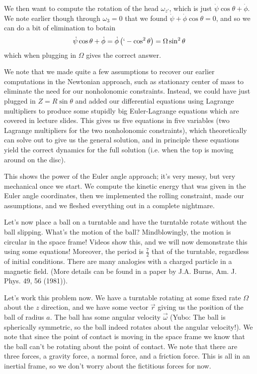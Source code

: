 \documentclass[10pt]{report}
\begin{document}
We then want to compute the rotation of the head $\omega_{z'}$, which is just $\dot{\psi}\cos\theta + \dot{\phi}$. We note earlier though through $\omega_3 = 0$ that we found $\dot{\psi} + \dot{\phi}\cos\theta = 0$, and so we can do a bit of elimination to botain
$$\dot{\psi}\cos\theta + \dot{\phi} = \dot{\phi}\left( `-\cos^2\theta \right) = \Omega\sin^2\theta$$
which when plugging in $\Omega$ gives the correct answer.

We note that we made quite a few assumptions to recover our earlier computations in the Newtonian approach, such as stationary center of mass to eliminate the need for our nonholonomic constraints. Instead, we could have just plugged in $Z = R\sin\theta$ and added our differential equations using Lagrange multipliers to produce some stupidly big Euler-Lagrange equations which are covered in lecture slides. This gives us five equations in five variables (two Lagrange multipliers for the two nonholonomic constraints), which theoretically can solve out to give us the general solution, and in principle these equations yield the correct dynamics for the full solution (i.e. when the top is moving around on the disc). 

This shows the power of the Euler angle approach; it's very messy, but very mechanical once we start. We compute the kinetic energy that was given in the Euler angle coordinates, then we implemented the rolling constraint, made our assumptions, and we fleshed everything out in a complete nightmare.

Let's now place a ball on a turntable and have the turntable rotate without the ball slipping. What's the motion of the ball? Mindblowingly, the motion is circular in the space frame! Videos show this, and we will now demonstrate this using some equations! Moreover, the period is $\frac{7}{2}$ that of the turntable, regardless of initial conditions. There are many analogies with a charged particle in a magnetic field. (More details can be found in a paper by J.A. Burns, Am. J. Phys. 49, 56 (1981)).

Let's work this problem now. We have a turntable rotating at some fixed rate $\Omega$ about the $z$ direction, and we have some vector $\vec{r}$ giving us the position of the ball of radius $a$. The ball has some angular velocity $\vec{\omega}$ (Yubo: The ball is spherically symmetric, so the ball indeed rotates about the angular velocity!). We note that since the point of contact is moving in the space frame we know that the ball can't be rotating about the point of contact. We note that there are three forces, a gravity force, a normal force, and a friction force. This is all in an inertial frame, so we don't worry about the fictitious forces for now. 
\end{document}
